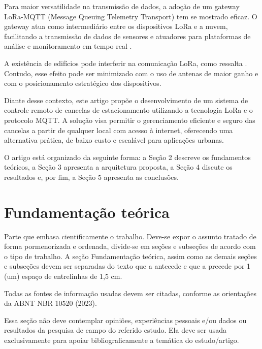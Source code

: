 \documentclass[
article,			%
11pt,				%
twoside,			%
a4paper,			%
section=TITLE,		%
onecolumn,          %
english,			%
brazil,				%
sumario=tradicional
]{abntex2}
\begin{document}
Para maior versatilidade na transmissão de dados, a adoção de um gateway LoRa-MQTT (Message Queuing Telemetry Transport) tem se mostrado eficaz. O gateway atua como intermediário entre os dispositivos LoRa e a nuvem, facilitando a transmissão de dados de sensores e atuadores para plataformas de análise e monitoramento em tempo real \cite{Bhawiyuga2019}.

A existência de edifícios pode interferir na comunicação LoRa, como ressalta \cite{lima2023}. Contudo, esse efeito pode ser minimizado com o uso de antenas de maior ganho e com o posicionamento estratégico dos dispositivos.

Diante desse contexto, este artigo propõe o desenvolvimento de um sistema de controle remoto de cancelas de estacionamento utilizando a tecnologia LoRa e o protocolo MQTT. A solução visa permitir o gerenciamento eficiente e seguro das cancelas a partir de qualquer local com acesso à internet, oferecendo uma alternativa prática, de baixo custo e escalável para aplicações urbanas.

O artigo está organizado da seguinte forma: a Seção 2 descreve os fundamentos teóricos, a Seção 3 apresenta a arquitetura proposta, a Seção 4 discute os resultados e, por fim, a Seção 5 apresenta as conclusões.


\section{Fundamentação teórica}

Parte que embasa cientificamente o trabalho. Deve-se expor o assunto tratado de forma pormenorizada e ordenada, divide-se em seções e subseções de acordo com o tipo de trabalho. A seção Fundamentação teórica, assim como as demais seções e subseções devem ser separadas do texto que a antecede e que a precede por 1 (um) espaço de entrelinhas de 1,5 cm.

Todas as fontes de informação usadas devem ser citadas, conforme as orientações da ABNT NBR 10520 (2023). 

Essa seção não deve contemplar opiniões, experiências pessoais e/ou dados ou resultados da pesquisa de campo do referido estudo. Ela deve ser usada exclusivamente para apoiar bibliograficamente a temática do estudo/artigo.
\end{document}
